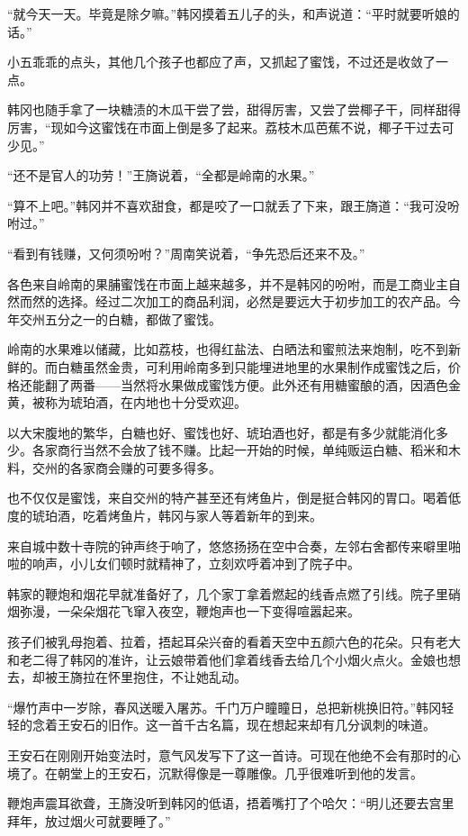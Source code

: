 “就今天一天。毕竟是除夕嘛。”韩冈摸着五儿子的头，和声说道：“平时就要听娘的话。”

小五乖乖的点头，其他几个孩子也都应了声，又抓起了蜜饯，不过还是收敛了一点。

韩冈也随手拿了一块糖渍的木瓜干尝了尝，甜得厉害，又尝了尝椰子干，同样甜得厉害，“现如今这蜜饯在市面上倒是多了起来。荔枝木瓜芭蕉不说，椰子干过去可少见。”

“还不是官人的功劳！”王旖说着，“全都是岭南的水果。”

“算不上吧。”韩冈并不喜欢甜食，都是咬了一口就丢了下来，跟王旖道：“我可没吩咐过。”

“看到有钱赚，又何须吩咐？”周南笑说着，“争先恐后还来不及。”

各色来自岭南的果脯蜜饯在市面上越来越多，并不是韩冈的吩咐，而是工商业主自然而然的选择。经过二次加工的商品利润，必然是要远大于初步加工的农产品。今年交州五分之一的白糖，都做了蜜饯。

岭南的水果难以储藏，比如荔枝，也得红盐法、白晒法和蜜煎法来炮制，吃不到新鲜的。而白糖虽然金贵，可利用岭南多到只能埋进地里的水果制作成蜜饯之后，价格还能翻了两番——当然将水果做成蜜饯方便。此外还有用糖蜜酿的酒，因酒色金黄，被称为琥珀酒，在内地也十分受欢迎。

以大宋腹地的繁华，白糖也好、蜜饯也好、琥珀酒也好，都是有多少就能消化多少。各家商行当然不会放了钱不赚。比起一开始的时候，单纯贩运白糖、稻米和木料，交州的各家商会赚的可要多得多。

也不仅仅是蜜饯，来自交州的特产甚至还有烤鱼片，倒是挺合韩冈的胃口。喝着低度的琥珀酒，吃着烤鱼片，韩冈与家人等着新年的到来。

来自城中数十寺院的钟声终于响了，悠悠扬扬在空中合奏，左邻右舍都传来噼里啪啦的响声，小儿女们顿时就精神了，立刻欢呼着冲到了院子中。

韩家的鞭炮和烟花早就准备好了，几个家丁拿着燃起的线香点燃了引线。院子里硝烟弥漫，一朵朵烟花飞窜入夜空，鞭炮声也一下变得喧嚣起来。

孩子们被乳母抱着、拉着，捂起耳朵兴奋的看着天空中五颜六色的花朵。只有老大和老二得了韩冈的准许，让云娘带着他们拿着线香去给几个小烟火点火。金娘也想去，却被王旖拉在怀里抱住，不让她乱动。

“爆竹声中一岁除，春风送暖入屠苏。千门万户瞳瞳日，总把新桃换旧符。”韩冈轻轻的念着王安石的旧作。这一首千古名篇，现在想起来却有几分讽刺的味道。

王安石在刚刚开始变法时，意气风发写下了这一首诗。可现在他绝不会有那时的心境了。在朝堂上的王安石，沉默得像是一尊雕像。几乎很难听到他的发言。

鞭炮声震耳欲聋，王旖没听到韩冈的低语，捂着嘴打了个哈欠：“明儿还要去宫里拜年，放过烟火可就要睡了。”

